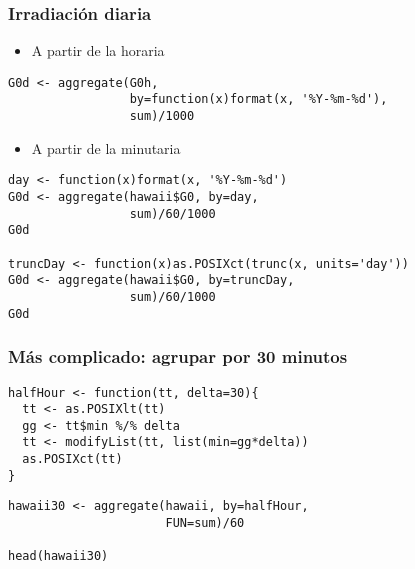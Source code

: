 \documentclass{beamer}
\begin{document}
\begin{frame}[fragile]
\frametitle{Irradiación diaria}
\label{sec-5-7}

\begin{itemize}
\item A partir de la horaria
\end{itemize}

\lstset{language=R}
\begin{lstlisting}
G0d <- aggregate(G0h,
                 by=function(x)format(x, '%Y-%m-%d'),
                 sum)/1000
\end{lstlisting}
\begin{itemize}
\item A partir de la minutaria
\end{itemize}

\lstset{language=R}
\begin{lstlisting}
day <- function(x)format(x, '%Y-%m-%d')
G0d <- aggregate(hawaii$G0, by=day,
                 sum)/60/1000
G0d

truncDay <- function(x)as.POSIXct(trunc(x, units='day'))
G0d <- aggregate(hawaii$G0, by=truncDay,
                 sum)/60/1000
G0d
\end{lstlisting}
\end{frame}
\begin{frame}[fragile]
\frametitle{Más complicado: agrupar por 30 minutos}
\label{sec-5-8}


\lstset{language=R}
\begin{lstlisting}
halfHour <- function(tt, delta=30){
  tt <- as.POSIXlt(tt)
  gg <- tt$min %/% delta
  tt <- modifyList(tt, list(min=gg*delta))
  as.POSIXct(tt)
}
\end{lstlisting}


\lstset{language=R}
\begin{lstlisting}
hawaii30 <- aggregate(hawaii, by=halfHour,
                      FUN=sum)/60

head(hawaii30)
\end{lstlisting}




  
  
  
  
  
  
  
  
  
\end{frame}
\end{document}
